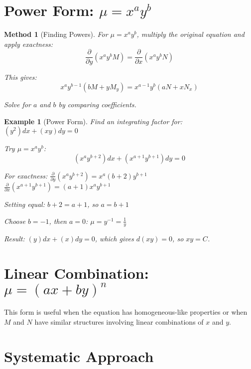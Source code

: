 \documentclass[12pt]{article}
\newtheorem{method}{Method}
\newtheorem{example}{Example}
\begin{document}
\section{Power Form: $\mu = x^a y^b$}

\begin{method}[Finding Powers]
For $\mu = x^a y^b$, multiply the original equation and apply exactness:
$$\frac{\partial}{\partial y}(x^a y^b M) = \frac{\partial}{\partial x}(x^a y^b N)$$

This gives:
$$x^a y^{b-1}(bM + y M_y) = x^{a-1} y^b (aN + x N_x)$$

Solve for $a$ and $b$ by comparing coefficients.
\end{method}

\begin{example}[Power Form]
Find an integrating factor for: $(y^2)dx + (xy)dy = 0$

Try $\mu = x^a y^b$:
$$(x^a y^{b+2})dx + (x^{a+1} y^{b+1})dy = 0$$

For exactness:
$\frac{\partial}{\partial y}(x^a y^{b+2}) = x^a(b+2)y^{b+1}$
$\frac{\partial}{\partial x}(x^{a+1} y^{b+1}) = (a+1)x^a y^{b+1}$

Setting equal: $b+2 = a+1$, so $a = b+1$

Choose $b = -1$, then $a = 0$: $\mu = y^{-1} = \frac{1}{y}$

Result: $(y)dx + (x)dy = 0$, which gives $d(xy) = 0$, so $xy = C$.
\end{example}

\section{Linear Combination: $\mu = (ax + by)^n$}

\begin{insight}
This form is useful when the equation has homogeneous-like properties or when $M$ and $N$ have similar structures involving linear combinations of $x$ and $y$.
\end{insight}

\section{Systematic Approach}
\end{document}
